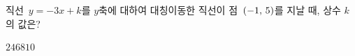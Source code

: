 직선~$y=-3x+k$를 $y$축에 대하여 대칭이동한 직선이 점~$(-1,\mkern3mu 5)$를 지날 때, 상수 $k$의 값은?
\begin{choices32}{$2$}{$4$}{$6$}{$8$}{$10$}\end{choices32}
